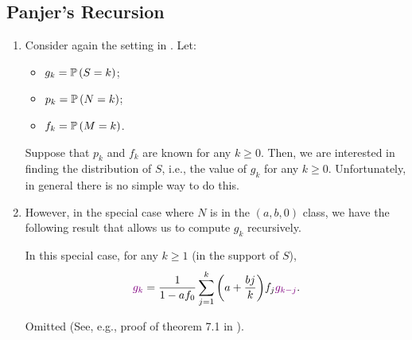 \subsection{Panjer's Recursion}
\begin{enumerate}
\item Consider again the setting in . Let:
\begin{itemize}
\item \(g_k=\mathbb{P}\left(S=k\right)\);
\item \(p_k=\mathbb{P}\left(N=k\right)\);
\item \(f_k=\mathbb{P}\left(M=k\right)\).
\end{itemize}
Suppose that \(p_k\) and \(f_k\) are known for any \(k\ge 0\). Then, we are
interested in finding the distribution of \(S\), i.e., the value of \(g_k\) for
any \(k\ge 0\). Unfortunately, in general there is no simple way to do this.

\item However, in the special case where \(N\) is in the \((a,b,0)\) class, we
have the following result that allows us to compute \(g_k\) recursively.
\begin{theorem}
\label{thm:panjer-recursion-ab0}
In this special case, for any \(k\ge 1\) (in the support of \(S\)),
\[
{\color{violet}g_k}=\frac{1}{1-af_0}\sum_{j=1}^{k}\qty(a+\frac{bj}{k})f_j{\color{violet}g_{k-j}}.
\]
\end{theorem}
\begin{pf}
Omitted (See, e.g., proof of theorem 7.1 in \textcite{klugman2019loss}).
\end{pf}


\end{enumerate}
